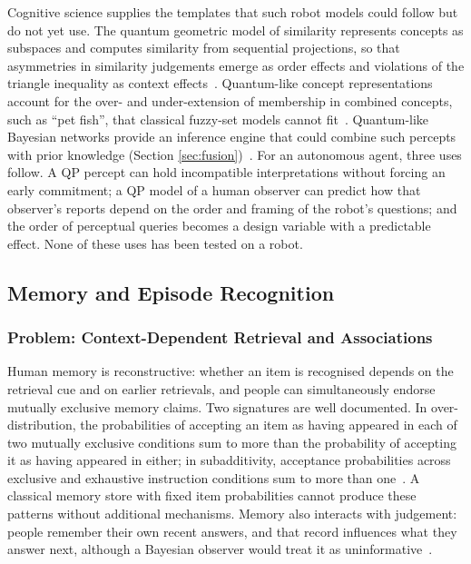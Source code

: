 \documentclass[pdflatex,sn-basic]{sn-jnl}
\begin{document}
Cognitive science supplies the templates that such robot models could follow but do not yet use. The quantum geometric model of similarity represents concepts as subspaces and computes similarity from sequential projections, so that asymmetries in similarity judgements emerge as order effects and violations of the triangle inequality as context effects~\citep{Pothos2013b}. Quantum-like concept representations account for the over- and under-extension of membership in combined concepts, such as ``pet fish'', that classical fuzzy-set models cannot fit~\citep{Aerts2009,Aerts2013}. Quantum-like Bayesian networks provide an inference engine that could combine such percepts with prior knowledge (Section \ref{sec:fusion})~\citep{Moreira2014}. For an autonomous agent, three uses follow. A QP percept can hold incompatible interpretations without forcing an early commitment; a QP model of a human observer can predict how that observer's reports depend on the order and framing of the robot's questions; and the order of perceptual queries becomes a design variable with a predictable effect. None of these uses has been tested on a robot.

\subsection{Memory and Episode Recognition}\label{sec:memory}

\subsubsection{Problem: Context-Dependent Retrieval and Associations}
Human memory is reconstructive: whether an item is recognised depends on the retrieval cue and on earlier retrievals, and people can simultaneously endorse mutually exclusive memory claims. Two signatures are well documented. In over-distribution, the probabilities of accepting an item as having appeared in each of two mutually exclusive conditions sum to more than the probability of accepting it as having appeared in either; in subadditivity, acceptance probabilities across exclusive and exhaustive instruction conditions sum to more than one~\citep{Trueblood2017b}. A classical memory store with fixed item probabilities cannot produce these patterns without additional mechanisms. Memory also interacts with judgement: people remember their own recent answers, and that record influences what they answer next, although a Bayesian observer would treat it as uninformative~\citep{Busemeyer2025}.
\end{document}
